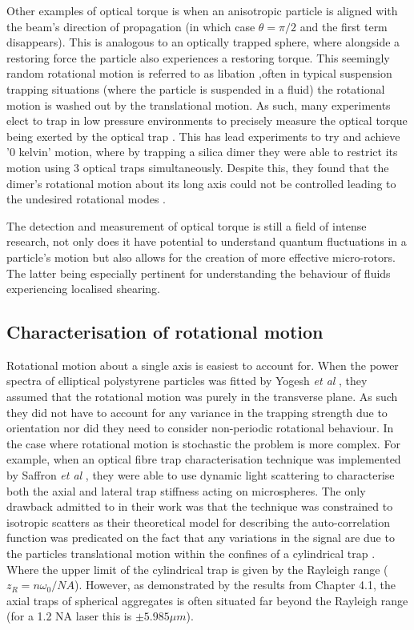 Other examples of optical torque is when an anisotropic 
particle is aligned with the beam's direction of propagation 
(in which case $\theta=\pi/2$ and the first term disappears). 
This is analogous to an optically trapped sphere, where 
alongside a restoring force the particle also experiences a 
restoring torque. This seemingly random rotational motion is 
referred to as libation \cite{Bruce2020},often in typical 
suspension trapping situations (where the particle is suspended 
in a fluid) the rotational motion is washed out by the 
translational motion. As such, many experiments elect to trap 
in low pressure environments to precisely measure the optical 
torque being exerted by the optical trap \cite{Ahn2018}. This 
has lead experiments to try and achieve '0 kelvin' motion, 
where by trapping a silica dimer they were able to restrict its 
motion using 3 optical traps simultaneously. Despite this, they 
found that the dimer's rotational motion about its long axis 
could not be controlled leading to the undesired rotational
modes \cite{Bang2020}.

The detection and measurement of optical torque is still a 
field of intense research, not only does it have potential 
to understand quantum fluctuations in a particle's motion 
but also allows for the creation of more effective
micro-rotors. The latter being especially pertinent for 
understanding the behaviour of fluids experiencing localised 
shearing.

\subsection{Characterisation of rotational motion}
Rotational motion about a single axis is easiest to account for.  
When the power spectra of elliptical polystyrene particles was 
fitted by Yogesh \textit{et al} \cite{Yogesha2011PreciseCO}, they 
assumed that the rotational motion was purely in the transverse
plane. As such they did not have to account for any variance in 
the trapping strength due to orientation nor did they need to
consider non-periodic rotational behaviour. In the case where 
rotational motion is stochastic the problem is more complex. 
For example, when an optical fibre trap characterisation 
technique was implemented by Saffron \textit{et al} 
\cite{BarZiv1997, Meller1998}, they were able to use dynamic 
light scattering to characterise both the axial and lateral 
trap stiffness acting on microspheres. The only drawback 
admitted to in their work was that the technique was constrained 
to isotropic scatters as their theoretical model for describing 
the auto-correlation function was predicated on the fact that 
any variations in the signal are due to the particles 
translational motion within the confines of a cylindrical trap 
\cite{BarZiv1997}. Where the upper limit of the cylindrical 
trap is given by the Rayleigh range ($z_R = n\omega_0/NA$).
However, as demonstrated by the results from Chapter 4.1, 
the axial traps of spherical aggregates is often situated 
far beyond the Rayleigh range (for a 1.2 NA laser this is 
$\pm5.985 \mu m$).

